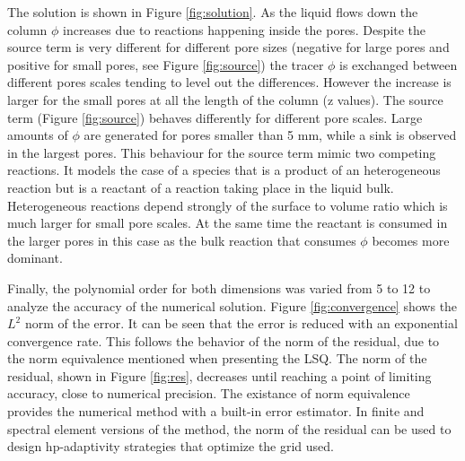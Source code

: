 \documentclass{CFD2011}
\newcommand{\TODO}[1]{\textcolor{blue}{TODO: #1} \\}
\begin{document}
The solution is shown in Figure \ref{fig:solution}. As the liquid flows down the column $\phi$ increases due to reactions happening inside the pores. Despite the source term is very different for different pore sizes (negative for large pores and positive for small pores, see Figure \ref{fig:source}) the tracer $\phi$ is exchanged between different pores scales tending to level out the differences. However the increase is larger for the small pores at all the length of the column (z values). The source term (Figure \ref{fig:source}) behaves differently for different pore scales. Large amounts of $\phi$ are generated for pores smaller than 5 mm, while a sink is observed in the largest pores. This behaviour for the source term mimic two competing reactions. It models the case of a species that is a product of an heterogeneous reaction but is a reactant of a reaction taking place in the liquid bulk. Heterogeneous reactions depend strongly of the surface to volume ratio which is much larger for small pore scales. At the same time the reactant is consumed in the larger pores in this case as the bulk reaction that consumes $\phi$ becomes more dominant.




Finally, the polynomial order for both dimensions was varied from 5 to 12 to analyze the accuracy of the numerical solution. Figure \ref{fig:convergence} shows the $L^2$ norm of the error. It can be seen that the error is reduced with an exponential convergence rate. This follows the behavior of the norm of the residual, due to the norm equivalence mentioned when presenting the LSQ. The norm of the residual, shown in Figure \ref{fig:res}, decreases until reaching a point of limiting accuracy, close to numerical precision. The existance of norm equivalence provides the numerical method with a built-in error estimator. In finite and spectral element versions of the method, the norm of the residual can be used to design hp-adaptivity strategies that optimize the grid used.
\end{document}
